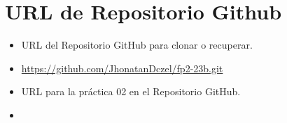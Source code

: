 	\section{URL de Repositorio Github}
	\begin{itemize}
            \item URL del Repositorio GitHub para clonar o recuperar.
            \item \url{https://github.com/JhonatanDczel/fp2-23b.git}
            \item URL para la práctica 02 en el Repositorio GitHub.
            \item \itemUrl
	\end{itemize}
